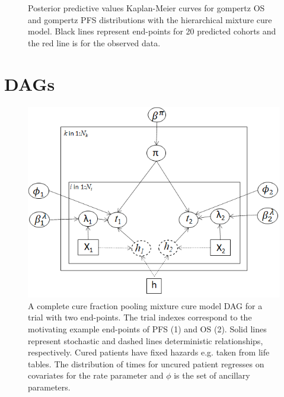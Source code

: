 \documentclass[AMA,STIX1COL]{WileyNJD-v2}
\begin{document}
\begin{figure}[H]
    \centering
    \qquad
    \caption{Posterior predictive values Kaplan-Meier curves for gompertz OS and gompertz PFS distributions with the hierarchical mixture cure model. Black lines represent end-points for 20 predicted cohorts and the red line is for the observed data.}%
\end{figure}

\section{DAGs}

\begin{figure}
\centering
\includegraphics[width=0.6\linewidth]{DAG_complete_pool.png}
\caption{\label{fig:dag_complete} A complete cure fraction pooling mixture cure model DAG for a trial with two end-points. The trial indexes correspond to the motivating example end-points of PFS (1) and OS (2).
Solid lines represent stochastic and dashed lines deterministic relationships, respectively.
Cured patients have fixed hazards e.g. taken from life tables.
The distribution of times for uncured patient regresses on covariates for the rate parameter and $\phi$ is the set of ancillary parameters.}
\end{figure}
\end{document}
